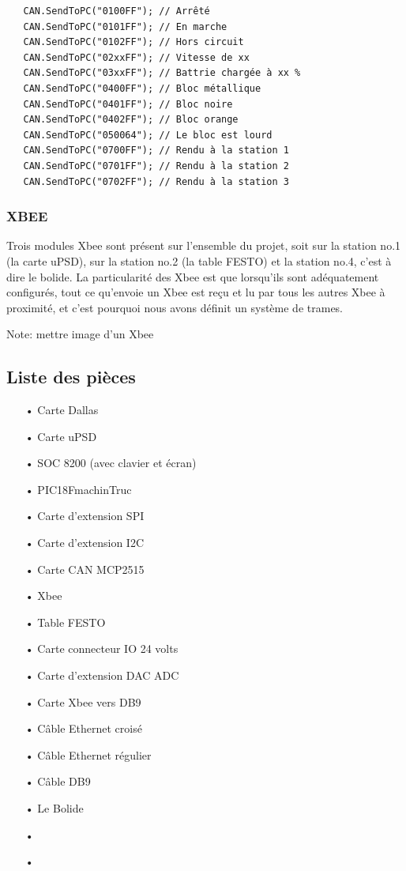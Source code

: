 \documentclass[10pt,a4paper,final]{article}
\begin{document}
\begin{lstlisting}
   CAN.SendToPC("0100FF"); // Arrêté
   CAN.SendToPC("0101FF"); // En marche
   CAN.SendToPC("0102FF"); // Hors circuit
   CAN.SendToPC("02xxFF"); // Vitesse de xx
   CAN.SendToPC("03xxFF"); // Battrie chargée à xx %
   CAN.SendToPC("0400FF"); // Bloc métallique
   CAN.SendToPC("0401FF"); // Bloc noire
   CAN.SendToPC("0402FF"); // Bloc orange
   CAN.SendToPC("050064"); // Le bloc est lourd
   CAN.SendToPC("0700FF"); // Rendu à la station 1
   CAN.SendToPC("0701FF"); // Rendu à la station 2
   CAN.SendToPC("0702FF"); // Rendu à la station 3
\end{lstlisting}
\begin{spacing}{1.5}
\pagebreak

\subsubsection{XBEE}
Trois modules Xbee sont présent sur l'ensemble du projet, soit sur la station no.1 (la carte uPSD), sur la station no.2 (la table FESTO) et la station no.4, c'est à dire le bolide. La particularité des Xbee est que lorsqu'ils sont adéquatement configurés, tout ce qu'envoie un Xbee est reçu et lu par tous les autres Xbee à proximité, et c'est pourquoi nous avons définit un système de trames.

Note: mettre image d'un Xbee

\subsection{Liste des pièces}
\begin{center}
\HRule
\end{center}
\begin{multicols}{3}
\begin{itemize}
\item[•]Carte Dallas
\item[•]Carte uPSD
\item[•]SOC 8200 (avec clavier et écran)
\item[•]PIC18FmachinTruc
\item[•]Carte d'extension SPI
\item[•]Carte d'extension I2C
\item[•]Carte CAN MCP2515
\item[•]Xbee
\item[•]Table FESTO
\item[•]Carte connecteur IO 24 volts
\item[•]Carte d'extension DAC ADC
\item[•]Carte Xbee vers DB9
\item[•]Câble Ethernet croisé
\item[•]Câble Ethernet régulier
\item[•]Câble DB9
\item[•]Le Bolide
\item[•]
\item[•]
\end{itemize}
\end{multicols}
\begin{center}
\HRule
\end{center}


\end{spacing}
\end{document}
